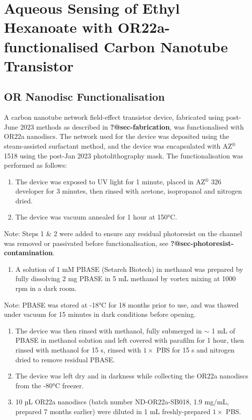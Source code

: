 \documentclass[
  a4paper,
]{scrbook}
\providecommand{\tightlist}{%
  \setlength{\itemsep}{0pt}\setlength{\parskip}{0pt}}\usepackage{longtable,booktabs,array}
\begin{document}
\hypertarget{sec-aqueous-sensing-EtHex}{%
\section{Aqueous Sensing of Ethyl Hexanoate with OR22a-functionalised
Carbon Nanotube Transistor}\label{sec-aqueous-sensing-EtHex}}

\hypertarget{sec-working-PBASE-functionalisation}{%
\subsection{OR Nanodisc
Functionalisation}\label{sec-working-PBASE-functionalisation}}

A carbon nanotube network field-effect transistor device, fabricated
using post-June 2023 methods as described in \textbf{?@sec-fabrication},
was functionalised with OR22a nanodiscs. The network used for the device
was deposited using the steam-assisted surfactant method, and the device
was encapsulated with AZ\(^\circledR\) 1518 using the post-Jan 2023
photolithography mask. The functionalisation was performed as follows:

\begin{enumerate}
\def\labelenumi{\arabic{enumi}.}
\item
  The device was exposed to UV light for 1 minute, placed in
  AZ\(^\circledR\) 326 developer for 3 minutes, then rinsed with
  acetone, isopropanol and nitrogen dried.
\item
  The device was vacuum annealed for 1 hour at 150°C.
\end{enumerate}

Note: Steps 1 \& 2 were added to ensure any residual photoresist on the
channel was removed or passivated before functionalisation, see
\textbf{?@sec-photoresist-contamination}.

\begin{enumerate}
\def\labelenumi{\arabic{enumi}.}
\setcounter{enumi}{2}
\tightlist
\item
  A solution of 1 mM PBASE (Setareh Biotech) in methanol was prepared by
  fully dissolving 2 mg PBASE in 5 mL methanol by vortex mixing at 1000
  rpm in a dark room.
\end{enumerate}

Note: PBASE was stored at -18°C for 18 months prior to use, and was
thawed under vacuum for 15 minutes in dark conditions before opening.

\begin{enumerate}
\def\labelenumi{\arabic{enumi}.}
\setcounter{enumi}{3}
\item
  The device was then rinsed with methanol, fully submerged in \(\sim\)
  1 mL of PBASE in methanol solution and left covered with parafilm for
  1 hour, then rinsed with methanol for 15 s, rinsed with \(1 \times\)
  PBS for 15 s and nitrogen dried to remove residual PBASE.
\item
  The device was left dry and in darkness while collecting the OR22a
  nanodiscs from the -80°C freezer.
\item
  10 µL OR22a nanodiscs (batch number ND-OR22a-SB018, 1.9 mg/mL,
  prepared 7 months earlier) were diluted in 1 mL freshly-prepared
  \(1 \times\) PBS.
\end{enumerate}
\end{document}
